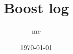 \documentclass[dvipsnames]{article}
\title{Boost log}
\date{\today}
\author{me}
\newcommand{\mycola}{MidnightBlue}
\newcommand{\Cola}[1]{\textcolor{\mycola}{\textbf{#1}}}
\begin{document}
\maketitle

\begin{comment}

  Usually you need to initialize a \Cola{sink} in order to use
  \texttt{boost.log}.

  \begin{tcolorbox}
    \emoji{parrot}  : But we still used trivial log all the time no? \\
    \emoji{turtle} : Yeah, that's because the library contains a `default` sink.
    (like the defualt constructor in C++). Once you defined a sink yourself, the
    default one is gone. Although you will still be able to use trivial logging
    macro.
  \end{tcolorbox}

  \section{File logging}

  Use the following to \Cola{initialize a logging sink} that stores log records
  into a text log.
  \begin{simplec}
    void init(){ logging::add_file_log("sample.log");

      logging::core::get()->set_filter( logging::trivial::severity >=
      logging::trivial::info ); }
  \end{simplec}

  \section{More sinks}

  You can register sink manually. Previously we created a file sink which is
  almost like
  \begin{simplec}
    void init() { // Construct the sink typedef sinks::synchronous_sink<
      sinks::text_ostream_backend > text_sink; boost::shared_ptr< text_sink > sink
      = boost::make_shared< text_sink >();

      // Add a stream to write log to sink->locked_backend()->add_stream(
      boost::make_shared< std::ofstream >("sample.log"));

      // Register the sink in the logging core
      logging::core::get()->add_sink(sink); }
  \end{simplec}


\end{comment}
\end{document}

